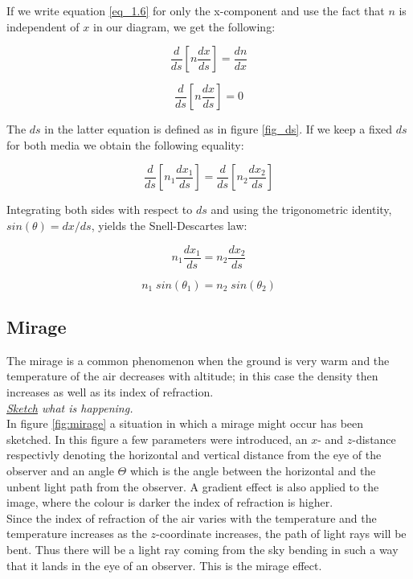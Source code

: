 \documentclass{article}
\begin{document}
If we write equation \ref{eq_1.6} for only the x-component and use the fact that $n$ is independent of $x$ in our diagram, we get the following:

\begin{equation}
	\frac{d}{ds} \left[ n \frac{d x}{ds} \right] = \frac{d n}{dx}
\end{equation}

\begin{equation}
	\frac{d}{ds} \left[ n \frac{d x}{ds} \right] = 0
\end{equation}

The $ds$ in the latter equation is defined as in figure \ref{fig_ds}. If we keep a fixed $ds$ for both media we obtain the following equality:

\begin{equation}
	\frac{d}{ds} \left[ n_1 \frac{d x_1}{ds} \right] = \frac{d}{ds} \left[ n_2 \frac{d x_2}{ds} \right]
\end{equation}

Integrating both sides with respect to $ds$ and using the trigonometric identity, $sin(\theta)= dx/ds$, yields the Snell-Descartes law:

\begin{equation}
	n_1 \frac{d x_1}{ds}=n_2 \frac{d x_2}{ds}
\end{equation}

\begin{equation}
	n_1 \; sin(\theta _1) = n_2 \; sin(\theta _2)
	\label{eq_snell}
\end{equation}

\subsection{Mirage}
The mirage is a common phenomenon when the ground is very warm and the temperature of the air decreases with altitude; in this case the density then increases as well as its index of refraction.\\
\vspace{3mm}
\textit{\underline{Sketch} what is happening.}\\
In figure \ref{fig:mirage} a situation in which a mirage might occur has been sketched. In this figure a few parameters were introduced, an $x$- and $z$-distance respectivly denoting the horizontal and vertical distance from the eye of the observer and an angle $\Theta$ which is the angle between the horizontal and the unbent light path from the observer. A gradient effect is also applied to the image, where the colour is darker the index of refraction is higher.\\
Since the index of refraction of the air varies with the temperature and the temperature increases as the $z$-coordinate increases, the path of light rays will be bent. Thus there will be a light ray coming from the sky bending in such a way that it lands in the eye of an observer. This is the mirage effect.\\
\end{document}
